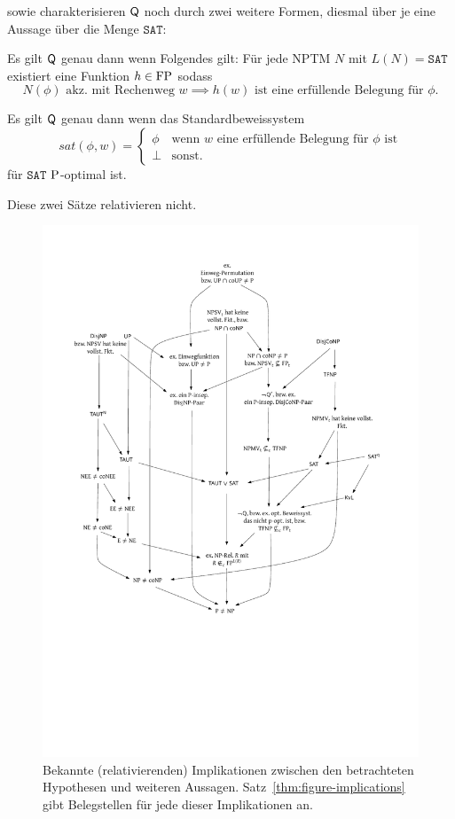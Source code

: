 \textcite{fenner_inverting_2003} sowie \textcite{kobler_is_2000} charakterisieren $\hQ$ noch durch zwei weitere Formen, diesmal über je eine Aussage über die Menge $\mathtt{SAT}$:

\begin{theorem}\label{thm:q-fenner}
    Es gilt $\hQ$ genau dann wenn Folgendes gilt: Für jede NPTM $N$ mit $L(N)=\mathtt{SAT}$ existiert eine Funktion $h\in \FP$ sodass 
\[ N(\phi) \text{ akz. mit Rechenweg $w$} \implies \text{$h(w)$ ist eine erfüllende Belegung für $\phi$.} \]
\end{theorem}
\begin{theorem}\label{thm:q-messner}
    Es gilt $\hQ$ genau dann wenn das Standardbeweissystem
            \[ \mathit{sat}(\phi, w) = \begin{cases} \phi & \text{wenn $w$ eine erfüllende Belegung für $\phi$ ist} \\ \bot & \text{sonst.} \end{cases}\]
            für $\mathtt{SAT}$ $\P$-optimal ist.
\end{theorem}
Diese zwei Sätze relativieren nicht.

\begin{figure}[p]
    \includegraphics[page=1]{figures.pdf}
    \caption{Bekannte (relativierenden) Implikationen zwischen den betrachteten Hypothesen und weiteren Aussagen. Satz~\ref{thm:figure-implications} gibt Belegstellen für jede dieser Implikationen an.}\label{fig:figure-implications}
    \forcerectofloat
\end{figure}

